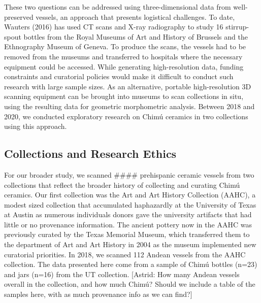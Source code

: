 \documentclass[]{interact}
\theoremstyle{plain}%
\theoremstyle{definition}
\theoremstyle{remark}
\begin{document}
These two questions can be addressed using three-dimensional data from
well-preserved vessels, an approach that presents logistical challenges.
To date, Wauters (2016) has used CT scans and X-ray radiography to study
16 stirrup-spout bottles from the Royal Museums of Art and History of
Brussels and the Ethnography Museum of Geneva. To produce the scans, the
vessels had to be removed from the museums and transferred to hospitals
where the necessary equipment could be accessed. While generating
high-resolution data, funding constraints and curatorial policies would
make it difficult to conduct such research with large sample sizes. As
an alternative, portable high-resolution 3D scanning equipment can be
brought into museums to scan collections in situ, using the resulting
data for geometric morphometric analysis. Between 2018 and 2020, we
conducted exploratory research on Chimú ceramics in two collections
using this approach.

\hypertarget{collections-and-research-ethics}{%
\subsection{Collections and Research
Ethics}\label{collections-and-research-ethics}}

For our broader study, we scanned \#\#\#\# prehispanic ceramic vessels
from two collections that reflect the broader history of collecting and
curating Chimú ceramics. Our first collection was the Art and Art
History Collection (AAHC), a modest sized collection that accumulated
haphazardly at the University of Texas at Austin as numerous individuals
donors gave the university artifacts that had little or no provenance
information. The ancient pottery now in the AAHC was previously curated
by the Texas Memorial Museum, which transferred them to the department
of Art and Art History in 2004 as the museum implemented new curatorial
priorities. In 2018, we scanned 112 Andean vessels from the AAHC
collection. The data presented here come from a sample of Chimú bottles
(n=23) and jars (n=16) from the UT collection. {[}Astrid: How many
Andean vessels overall in the collection, and how much Chimú? Should we
include a table of the samples here, with as much provenance info as we
can find?{]}
\end{document}

